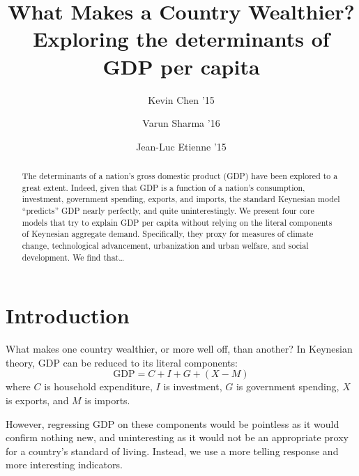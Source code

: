 \documentclass[11pt]{article}
\title{
  \sc
  What Makes a Country Wealthier? \\
  {\large Exploring the determinants of GDP per capita}
}
\author{
    {\rm Kevin Chen '15} \\ 
    \and
    {\rm Varun Sharma '16} \\ 
    \and
    {\rm Jean-Luc Etienne '15} \\ 
}
\begin{document}
\date{}
\maketitle
\doublespacing


\begin{abstract}
The determinants of a nation's gross domestic product (GDP) have been explored to a great extent. Indeed, given that GDP is a function of a nation's consumption, investment, government spending, exports, and imports, the standard Keynesian model ``predicts'' GDP nearly perfectly, and quite uninterestingly. We present four core models that try to explain GDP per capita without relying on the literal components of Keynesian aggregate demand. Specifically, they proxy for measures of climate change, technological advancement, urbanization and urban welfare, and social development. We find that\dots %
\end{abstract}

\newpage








\section{Introduction}
What makes one country wealthier, or more well off, than another? In Keynesian theory, GDP can be reduced to its literal components:
$$\mathrm{GDP} = C + I + G + (X - M)$$
where $C$ is household expenditure, $I$ is investment,  $G$ is government spending, $X$ is exports, and $M$ is imports.

However, regressing GDP on these components would be pointless as it would confirm nothing new, and uninteresting as it would not be an appropriate proxy for a country's standard of living. Instead, we use a more telling response and more interesting indicators.
\end{document}
